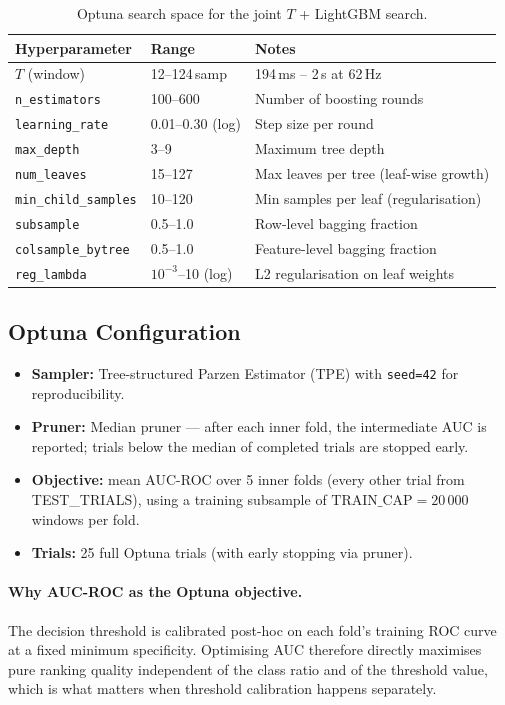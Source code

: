 \documentclass[12pt,a4paper]{article}
\begin{document}
\begin{table}[ht]
\centering
\caption{Optuna search space for the joint $T$ + LightGBM search.}
\label{tab:search_space}
\begin{tabular}{lll}
\toprule
Hyperparameter & Range & Notes \\
\midrule
$T$ (window) & 12--124\,samp & 194\,ms -- 2\,s at 62\,Hz \\
\texttt{n\_estimators} & 100--600 & Number of boosting rounds \\
\texttt{learning\_rate} & 0.01--0.30 (log) & Step size per round \\
\texttt{max\_depth} & 3--9 & Maximum tree depth \\
\texttt{num\_leaves} & 15--127 & Max leaves per tree (leaf-wise growth) \\
\texttt{min\_child\_samples} & 10--120 & Min samples per leaf (regularisation) \\
\texttt{subsample} & 0.5--1.0 & Row-level bagging fraction \\
\texttt{colsample\_bytree} & 0.5--1.0 & Feature-level bagging fraction \\
\texttt{reg\_lambda} & $10^{-3}$--10 (log) & L2 regularisation on leaf weights \\
\bottomrule
\end{tabular}
\end{table}

\subsection{Optuna Configuration}

\begin{itemize}[leftmargin=1.5em]
  \item \textbf{Sampler:} Tree-structured Parzen Estimator (TPE) with
        \texttt{seed=42} for reproducibility.
  \item \textbf{Pruner:} Median pruner — after each inner fold, the
        intermediate AUC is reported; trials below the median of completed
        trials are stopped early.
  \item \textbf{Objective:} mean AUC-ROC over 5 inner folds (every other
        trial from TEST\_TRIALS), using a training subsample of
        $\text{TRAIN\_CAP} = 20\,000$ windows per fold.
  \item \textbf{Trials:} 25 full Optuna trials (with early stopping via
        pruner).
\end{itemize}

\paragraph{Why AUC-ROC as the Optuna objective.}
The decision threshold is calibrated post-hoc on each fold's training ROC
curve at a fixed minimum specificity. Optimising AUC therefore directly
maximises pure ranking quality independent of the class ratio and of the
threshold value, which is what matters when threshold calibration happens
separately.
\end{document}
